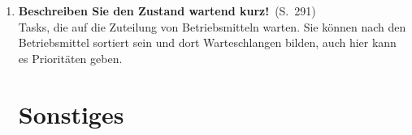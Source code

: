 \documentclass[a4paper,12pt]{article}
\newcommand{\statement}[3]{\pagebreak[3]\item {\textbf{#1!}}\ (S.\ #2)#3}
\newcommand{\normaltext}[1]{\\#1}
\newcommand{\page}[1]{#1}
\begin{document}
\begin{enumerate}
  \statement{Beschreiben Sie den Zustand wartend kurz}
      {\page{291}}
  {
  \normaltext{Tasks, die auf die Zuteilung von Betriebsmitteln warten. Sie 
  können nach den Betriebsmittel sortiert sein und dort Warteschlangen bilden,
  auch hier kann es Prioritäten geben.}
  }

  \newpage
  \section{Sonstiges}

\end{enumerate}
\end{document}
